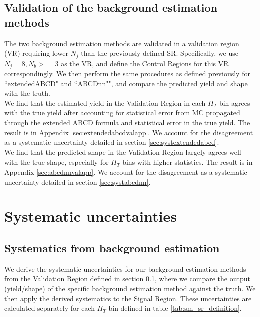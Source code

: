\documentclass[twoside]{article}
\begin{document}
\subsection{Validation of the background estimation methods}
\label{sec:validationregion}
The two background estimation methods are validated in a validation region (VR) requiring lower $N_j$ than the previously defined SR. Specifically, we use $N_j=8, N_b>=3$ as the VR, and define the Control Regions for this VR correspondingly. We then perform the same procedures as defined previously for ``extendedABCD" and ``ABCDnn"", and compare the predicted yield and shape with the truth. \\

We find that the estimated yield in the Validation Region in each $H_T$ bin agrees with the true yield after accounting for statistical error from MC propagated through the extended ABCD formula and statistical error in the true yield. The result is in Appendix \ref{sec:extendedabcdvalapp}. We account for the disagreement as a systematic uncertainty detailed in section \ref{sec:systextendedabcd}.\\

We find that the predicted shape in the Validation Region largely agrees well with the true shape, especially for $H_T$ bins with higher statistics. The result is in Appendix \ref{sec:abcdnnvalapp}. We account for the disagreement as a systematic uncertainty detailed in section \ref{sec:systabcdnn}. 



\section{Systematic uncertainties}
\label{sec:syst}
\subsection{Systematics from background estimation}
We derive the systematic uncertainties for our background estimation methods from the Validation Region defined in section \ref{sec:validationregion}, where we compare the output (yield/shape) of the specific background estimation method against the truth. We then apply the derived systematics to the Signal Region. These uncertainties are calculated separately for each $H_T$ bin defined in table \ref{tab:sm_sr_definition}.
\end{document}
